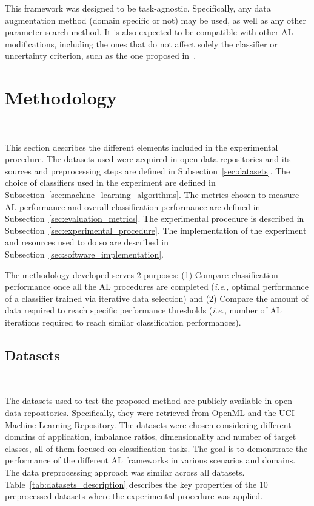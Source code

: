 \documentclass[parskip=full]{scrartcl}
\begin{document}
This framework was designed to be task-agnostic. Specifically, any data
augmentation method (domain specific or not) may be used, as well as any other
parameter search method. It is also expected to be compatible with other AL
modifications, including the ones that do not affect solely the classifier or
uncertainty criterion, such as the one proposed in~\cite{Yoo2019}.

\section{Methodology}~\label{sec:methodology}

This section describes the different elements included in the experimental
procedure. The datasets used were acquired in open data repositories and its
sources and preprocessing steps are defined in Subsection~\ref{sec:datasets}.
The choice of classifiers used in the experiment are defined in
Subsection~\ref{sec:machine_learning_algorithms}. The metrics chosen to
measure AL performance and overall classification performance are defined in
Subsection~\ref{sec:evaluation_metrics}. The experimental procedure is
described in Subsection~\ref{sec:experimental_procedure}. The implementation
of the experiment and resources used to do so are described in
Subsection~\ref{sec:software_implementation}.

The methodology developed serves 2 purposes: (1) Compare classification
performance once all the AL procedures are completed (\textit{i.e.,} optimal
performance of a classifier trained via iterative data selection) and (2)
Compare the amount of data required to reach specific performance thresholds
(\textit{i.e.,} number of AL iterations required to reach similar
classification performances).

\subsection{Datasets}~\label{sec:datasets}

The datasets used to test the proposed method are publicly available in open
data repositories. Specifically, they were retrieved from
\href{https://www.openml.org/}{OpenML} and the
\href{https://archive.ics.uci.edu/}{UCI Machine Learning Repository}. The
datasets were chosen considering different domains of application, imbalance
ratios, dimensionality and number of target classes, all of them focused on
classification tasks. The goal is to demonstrate the performance of the
different AL frameworks in various scenarios and domains. The data
preprocessing approach was similar across all datasets.
Table~\ref{tab:datasets_description} describes the key properties of the 10
preprocessed datasets where the experimental procedure was applied. 
\end{document}
